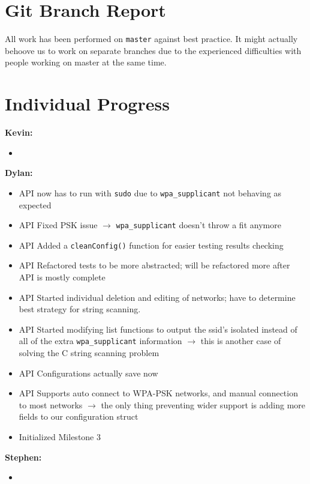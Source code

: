 \documentclass[11pt]{article}
\begin{document}
\section{Git Branch Report}
All work has been performed on \texttt{master} against best practice. It might actually behoove us to
work on separate branches due to the experienced difficulties with people working on master at the same
time.


\section{Individual Progress}

\textbf{Kevin:}
\begin{itemize}
  \item
\end{itemize}

\textbf{Dylan:}
\begin{itemize}
  \item API now has to run with \texttt{sudo} due to \texttt{wpa\_supplicant} not behaving as expected
  \item API Fixed PSK issue $\rightarrow$ \texttt{wpa\_supplicant} doesn't throw a fit anymore
  \item API Added a \texttt{cleanConfig()} function for easier testing results checking
  \item API Refactored tests to be more abstracted; will be refactored more after API is mostly complete
  \item API Started individual deletion and editing of networks; have to determine best strategy for string scanning.
  \item API Started modifying list functions to output the ssid's isolated instead of all of the extra \texttt{wpa\_supplicant}
    information $\rightarrow$ this is another case of solving the C string scanning problem
  \item API Configurations actually save now
  \item API Supports auto connect to WPA-PSK networks, and manual connection to most networks $\rightarrow$ the only thing
    preventing wider support is adding more fields to our configuration struct
  \item Initialized Milestone 3
\end{itemize}

\textbf{Stephen:}
\begin{itemize}
  \item
\end{itemize}
\end{document}

